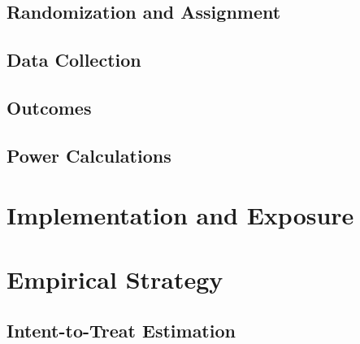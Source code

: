 \documentclass[12pt]{article}
\begin{document}
\subsection{Randomization and Assignment}

\subsection{Data Collection}

\subsection{Outcomes}

\subsection{Power Calculations}

\section{Implementation and Exposure}

\section{Empirical Strategy}
\subsection{Intent-to-Treat Estimation}
\end{document}
